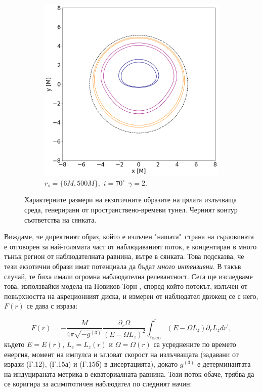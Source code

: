 \documentclass[12pt]{article}
\numberwithin{equation}{section}
\numberwithin{figure}{section}
\begin{document}
\begin{figure}[!htb]
\begin{subfigure}{7cm}
		\includegraphics[scale = 0.25]{Section_6_Morphology_of_the images_of_horizonless_spacetimes/WH_70_deg_r6_r500.png}
		\caption{$r_s = \{6M, 500M\},\,\, i = 70^\circ\,\,\, \gamma = 2$.}
	\end{subfigure}
		\caption[Характерните размери на екзотичните образите на цялата излъчваща среда, генерирани от пространствено-времеви тунел.]{\small Характерните размери на екзотичните образите на цялата излъчваща среда, генерирани от пространствено-времеви тунел. Черният контур съответства на сянката.} 
		\label{WH_img_size_deg}
	\end{figure}
	
	Виждаме, че директният образ, който е излъчен "нашата"$\,$ страна на гърловината е отговорен за най-голямата част от наблюдаваният поток, е концентиран в много тънък регион от наблюдателната равнина, вътре в сянката. Това подсказва, че тези екзотични образи имат потенциала да бъдат \emph{много интензивни}. В такъв случай, те биха имали огромна наблюдателна релевантност. Сега ще изследваме това, използвайки модела на Новиков-Торн \cite{Page1973}, според който потокът, излъчен от повърхността на акреционният диска, и измерен от наблюдател движещ се с него, $F(r)$ се дава с израза:
		
	\begin{equation}
		F(r) = - \frac{\dot{M}}{4\pi\sqrt{-g^{(3)}}}\frac{\partial_r\Omega}{\left(E - \Omega L_z\right)^2}\int_{r_\text{ISCO}}^r \left(E - \Omega L_z\right)\partial_rL_zdr^\prime,
	\end{equation}
	където $E = E(r)$, $L_z = L_z(r)$ и $\Omega = \Omega(r)$ са усреднените по времето енергия, момент на импулса и ъгловат скорост на излъчващата (задавани от изрази (Г.12), (Г.15а) и (Г.15б) в дисертацията), докато $g^{(3)}$ е детерминантата на индуцираната метрика в екваториалната равнина. Този поток обаче, трябва да се коригира за асимптотичен наблюдател по следният начин:
	
\end{document}
